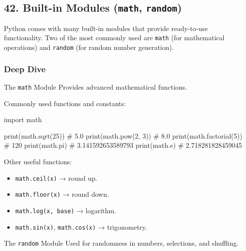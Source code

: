 \documentclass[
  letterpaper,
  DIV=11,
  numbers=noendperiod]{scrreprt}
\newenvironment{Shaded}{\begin{snugshade}}{\end{snugshade}}
\newcommand{\BuiltInTok}[1]{\textcolor[rgb]{0.00,0.23,0.31}{#1}}
\newcommand{\CommentTok}[1]{\textcolor[rgb]{0.37,0.37,0.37}{#1}}
\newcommand{\DecValTok}[1]{\textcolor[rgb]{0.68,0.00,0.00}{#1}}
\newcommand{\ImportTok}[1]{\textcolor[rgb]{0.00,0.46,0.62}{#1}}
\newcommand{\NormalTok}[1]{\textcolor[rgb]{0.00,0.23,0.31}{#1}}
\providecommand{\tightlist}{%
  \setlength{\itemsep}{0pt}\setlength{\parskip}{0pt}}
\begin{document}
\subsection{\texorpdfstring{42. Built-in Modules (\texttt{math},
\texttt{random})}{42. Built-in Modules (math, random)}}\label{built-in-modules-math-random}

Python comes with many built-in modules that provide ready-to-use
functionality. Two of the most commonly used are \texttt{math} (for
mathematical operations) and \texttt{random} (for random number
generation).

\subsubsection{Deep Dive}\label{deep-dive-41}

The \texttt{math} Module Provides advanced mathematical functions.

Commonly used functions and constants:

\begin{Shaded}
\begin{Highlighting}[]
\ImportTok{import}\NormalTok{ math}

\BuiltInTok{print}\NormalTok{(math.sqrt(}\DecValTok{25}\NormalTok{))     }\CommentTok{\# 5.0}
\BuiltInTok{print}\NormalTok{(math.}\BuiltInTok{pow}\NormalTok{(}\DecValTok{2}\NormalTok{, }\DecValTok{3}\NormalTok{))    }\CommentTok{\# 8.0}
\BuiltInTok{print}\NormalTok{(math.factorial(}\DecValTok{5}\NormalTok{)) }\CommentTok{\# 120}
\BuiltInTok{print}\NormalTok{(math.pi)           }\CommentTok{\# 3.141592653589793}
\BuiltInTok{print}\NormalTok{(math.e)            }\CommentTok{\# 2.718281828459045}
\end{Highlighting}
\end{Shaded}

Other useful functions:

\begin{itemize}
\tightlist
\item
  \texttt{math.ceil(x)} → round up.
\item
  \texttt{math.floor(x)} → round down.
\item
  \texttt{math.log(x,\ base)} → logarithm.
\item
  \texttt{math.sin(x)}, \texttt{math.cos(x)} → trigonometry.
\end{itemize}

The \texttt{random} Module Used for randomness in numbers, selections,
and shuffling.
\end{document}
